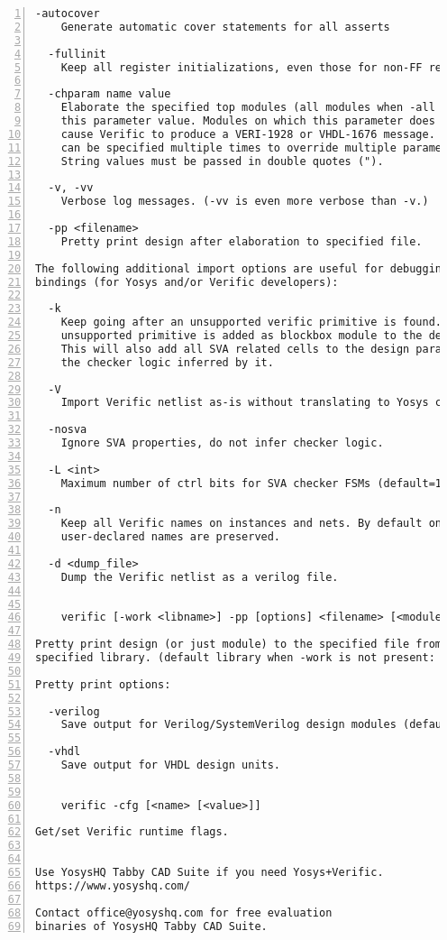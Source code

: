 \begin{lstlisting}[numbers=left,frame=single]
  -autocover
    Generate automatic cover statements for all asserts

  -fullinit
    Keep all register initializations, even those for non-FF registers.

  -chparam name value 
    Elaborate the specified top modules (all modules when -all given) using
    this parameter value. Modules on which this parameter does not exist will
    cause Verific to produce a VERI-1928 or VHDL-1676 message. This option
    can be specified multiple times to override multiple parameters.
    String values must be passed in double quotes (").

  -v, -vv
    Verbose log messages. (-vv is even more verbose than -v.)

  -pp <filename>
    Pretty print design after elaboration to specified file.

The following additional import options are useful for debugging the Verific
bindings (for Yosys and/or Verific developers):

  -k
    Keep going after an unsupported verific primitive is found. The
    unsupported primitive is added as blockbox module to the design.
    This will also add all SVA related cells to the design parallel to
    the checker logic inferred by it.

  -V
    Import Verific netlist as-is without translating to Yosys cell types. 

  -nosva
    Ignore SVA properties, do not infer checker logic.

  -L <int>
    Maximum number of ctrl bits for SVA checker FSMs (default=16).

  -n
    Keep all Verific names on instances and nets. By default only
    user-declared names are preserved.

  -d <dump_file>
    Dump the Verific netlist as a verilog file.


    verific [-work <libname>] -pp [options] <filename> [<module>]..

Pretty print design (or just module) to the specified file from the
specified library. (default library when -work is not present: "work")

Pretty print options:

  -verilog
    Save output for Verilog/SystemVerilog design modules (default).

  -vhdl
    Save output for VHDL design units.


    verific -cfg [<name> [<value>]]

Get/set Verific runtime flags.


Use YosysHQ Tabby CAD Suite if you need Yosys+Verific.
https://www.yosyshq.com/

Contact office@yosyshq.com for free evaluation
binaries of YosysHQ Tabby CAD Suite.
\end{lstlisting}

